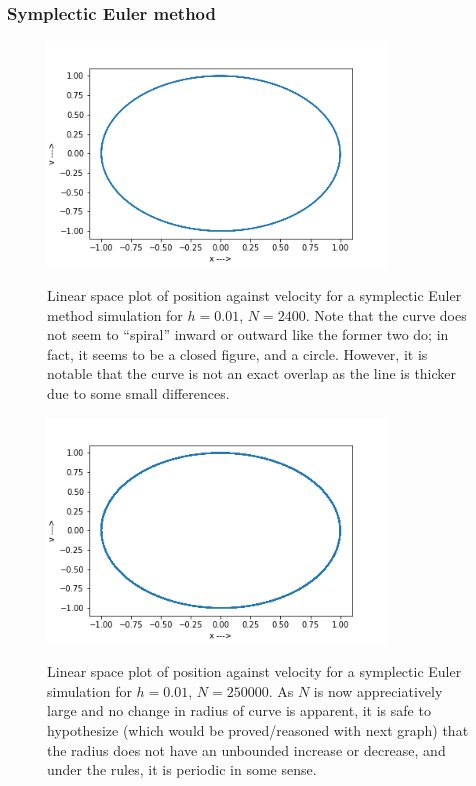 \documentclass{report}
\begin{document}
\subsubsection*{Symplectic Euler method}
\begin{figure}[H]
	\centering
	\includegraphics[width = 0.8\textwidth]{euler.png}
	\label{eulerphase}
	\caption{Linear space plot of position against velocity for a symplectic Euler method simulation for $h=0.01$, $N=2400$. Note that the curve does not seem to ``spiral'' inward or outward like the former two do; in fact, it seems to be a closed figure, and a circle. However, it is notable that the curve is not an exact overlap as the line is thicker due to some small differences.}
\end{figure}
\begin{figure}[H]
	\centering
	\includegraphics[width = 0.8\textwidth]{euler2.png}
	\label{eulermag}
	\caption{Linear space plot of position against velocity for a symplectic Euler simulation for $h=0.01$, $N= 250000$. As $N$ is now appreciatively large and no change in radius of curve is apparent, it is safe to hypothesize (which would be proved/reasoned with next graph) that the radius does not have an unbounded increase or decrease, and under the rules, it is periodic in some sense.}
\end{figure}
\end{document}
